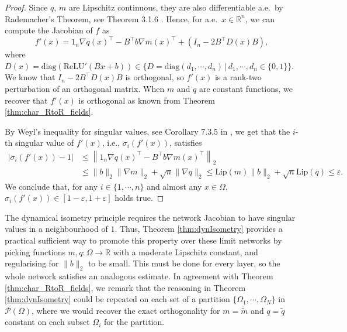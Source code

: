 \documentclass{article}
\theoremstyle{plain}
\theoremstyle{definition}
\theoremstyle{definition}
\theoremstyle{remark}
\theoremstyle{definition}
\theoremstyle{definition}
\theoremstyle{remark}
\numberwithin{equation}{section}
\begin{document}
\begin{proof}
Since $q$, $m$ are Lipschitz continuous, they are also differentiable a.e.\, by Rademacher's Theorem, see Theorem 3.1.6 \cite{federer2014geometric}. Hence, for a.e.\, $x \in \mathbb{R}^n$, we can compute the Jacobian of $f$ as
\begin{equation}\label{eq:limit_jac}
f'(x)= 1_n\nabla q(x)^\top - B^\top b\nabla m(x)^\top + (I_n- 2B^\top D(x)B),
\end{equation}
where $D(x)=\mathrm{diag}(\mathrm{ReLU}'(Bx+b))\in \{D=\mathrm{diag}(d_1,\cdots,d_n)\,|\,d_1,\cdots,d_n\in\{0, 1\}\}$. We know that $I_n-2B^\top D(x)B$ is orthogonal, so $f'(x)$ is a rank-two perturbation of an orthogonal matrix. When $m$ and $q$ are constant functions, we recover that $f'(x)$ is orthogonal as known from Theorem \ref{thm:char_RtoR_fields}.

By Weyl's inequality for singular values, see Corollary 7.3.5 in \cite{horn2012matrix}, we get that the $i$-th singular value of $f'(x)$, i.e., $\sigma_i(f'(x))$, satisfies
\begin{align*}
\left|\sigma_i\left(f'(x)\right)-1\right|&\leq \left\|1_n\nabla q(x)^\top - B^\top b \nabla m(x)^\top\right\|_2\\
&\leq \|b\|_2\|\nabla m\|_2 + \sqrt{n}\|\nabla q\|_2 \leq \mathrm{Lip}(m)\|b\|_2 + \sqrt{n}\mathrm{Lip}(q) \leq \varepsilon.
\end{align*}
We conclude that, for any $i\in\{1,\cdots,n\}$ and almost any $x\in\Omega$, $\sigma_i(f'(x))\in [1-\varepsilon,1+\varepsilon]$ holds true.
\end{proof}

The dynamical isometry principle requires the network Jacobian to have singular values in a neighbourhood of $1$. Thus, Theorem \ref{thm:dynIsometry} provides a practical sufficient way to promote this property over these limit networks by picking functions $m,q:\Omega\to\mathbb{R}$ with a moderate Lipschitz constant, and regularising for $\|b\|_2$ to be small. This must be done for every layer, so the whole network satisfies an analogous estimate. %
In agreement with Theorem \ref{thm:char_RtoR_fields}, we remark that the reasoning in Theorem \ref{thm:dynIsometry} could be repeated on each set of a partition $\{\Omega_1,\cdots,\Omega_N\}$ in $\mathcal{P}(\Omega)$, where we would recover the exact orthogonality for $m=\widetilde{m}$ and $q=\widetilde{q}$ constant on each subset $\Omega_i$ for the partition.
\end{document}
